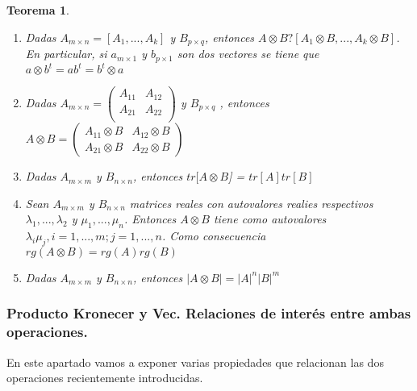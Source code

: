 \documentclass{article}
\theoremstyle{theorem-style}  %
\newtheorem{theorem}{Teorema}[section]  %
\theoremstyle{definition-style}
\theoremstyle{example-style}
\theoremstyle{exercise-style}
\begin{document}
\begin{theorem}
\begin{enumerate}
			\item \textit{Dadas $A_{m \times n} = [A_1, ..., A_k]$ y $B_{p \times q}$, entonces $A \otimes B ? [A_1 \otimes B, ..., A_k \otimes B]$. En particular, si $a_{m \times 1}$ y $b_{p \times 1}$ son dos vectores se tiene que $a \otimes b^t = ab^t = b^t \otimes a$ }
			
			\item \textit{Dadas $A_{m \times n} =\left( {\begin{array}{cc}
					A_{11} & A_{12}\\
					A_{21} & A_{22}\\
					\end{array}}\right)$ 			 y $B_{p \times q}$ , entonces $A \otimes B = \left( {\begin{array}{cc}
					A_{11} \otimes B & A_{12} \otimes B\\
					A_{21}  \otimes B & A_{22} \otimes B
					\end{array}}\right)  $}
			
			\item \textit{Dadas $A_{m \times m}$ y $B_{n \times n}$, entonces $tr[A \otimes B$] = $tr[A]tr[B]$}
			
			\item \textit{Sean $A_{m \times m}$ y $B_{n \times n}$ matrices reales con autovalores realies respectivos $\lambda_1, ..., \lambda_2$ y $\mu_1, ..., \mu_n$. Entonces $A \otimes B$ tiene como autovalores $\lambda_i \mu_j, i = 1, ..., m; j = 1,...,n$. Como consecuencia $rg(A \otimes B) = rg(A)rg(B)$}
			
			\item \textit{Dadas $A_{m \times m }$ y $B_{n \times n}$, entonces $|A \otimes B| = |A|^n |B|^m$}
			
			
		\end{enumerate}
	\end{theorem}
	
	
	\subsubsection{Producto Kronecer y Vec. Relaciones de interés entre ambas operaciones.}
	
	En este apartado vamos a exponer varias propiedades que relacionan las dos operaciones recientemente introducidas.
	
\end{document}

